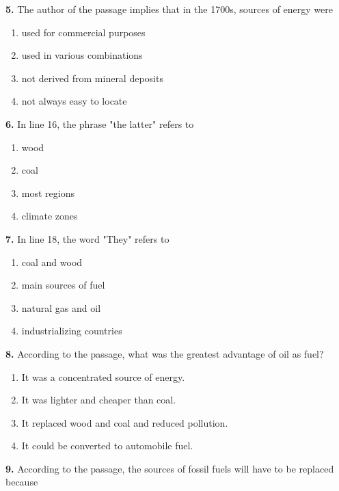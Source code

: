 \documentclass[12pt]{article}
\begin{document}
\noindent\textbf{5.} The author of the passage implies that in the 1700s, sources of energy were
\begin{enumerate}[label=(\Alph*),leftmargin=*,itemsep=0.2em]
\item used for commercial purposes
\item used in various combinations
\item not derived from mineral deposits
\item not always easy to locate
\end{enumerate}
\par
\vspace{0.25\baselineskip}
\noindent\textbf{6.} In line 16, the phrase "the latter" refers to
\begin{enumerate}[label=(\Alph*),leftmargin=*,itemsep=0.2em]
\item wood
\item coal
\item most regions
\item climate zones
\end{enumerate}
\par
\vspace{0.25\baselineskip}
\noindent\textbf{7.} In line 18, the word "They" refers to
\begin{enumerate}[label=(\Alph*),leftmargin=*,itemsep=0.2em]
\item coal and wood
\item main sources of fuel
\item natural gas and oil
\item industrializing countries
\end{enumerate}
\par
\vspace{0.25\baselineskip}
\noindent\textbf{8.} According to the passage, what was the greatest advantage of oil as fuel?
\begin{enumerate}[label=(\Alph*),leftmargin=*,itemsep=0.2em]
\item It was a concentrated source of energy.
\item It was lighter and cheaper than coal.
\item It replaced wood and coal and reduced pollution.
\item It could be converted to automobile fuel.
\end{enumerate}
\par
\vspace{0.25\baselineskip}
\noindent\textbf{9.} According to the passage, the sources of fossil fuels will have to be replaced because
\end{document}
